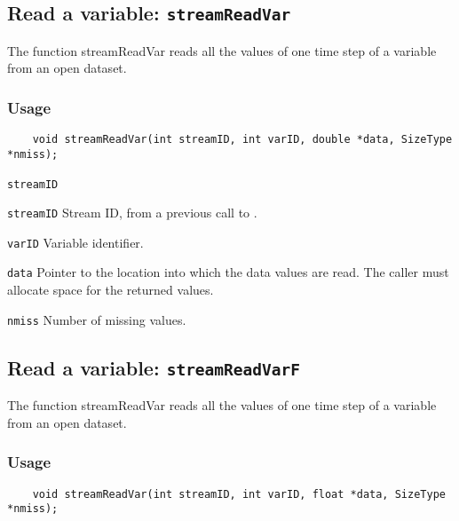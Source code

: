 

\subsection{Read a variable: \texttt{streamReadVar}}
\label{streamReadVar}

The function streamReadVar reads all the values of one time step of a variable
from an open dataset.
\subsubsection*{Usage}

\begin{verbatim}
    void streamReadVar(int streamID, int varID, double *data, SizeType *nmiss);
\end{verbatim}

\hspace*{4mm}\begin{minipage}[]{15cm}
\begin{deflist}{\texttt{streamID}\ }
\item[\texttt{streamID}]
Stream ID, from a previous call to {}.
\item[\texttt{varID}]
Variable identifier.
\item[\texttt{data}]
Pointer to the location into which the data values are read.
                     The caller must allocate space for the returned values.
\item[\texttt{nmiss}]
Number of missing values.

\end{deflist}
\end{minipage}


\subsection{Read a variable: \texttt{streamReadVarF}}
\label{streamReadVarF}

The function streamReadVar reads all the values of one time step of a variable
from an open dataset.
\subsubsection*{Usage}

\begin{verbatim}
    void streamReadVar(int streamID, int varID, float *data, SizeType *nmiss);
\end{verbatim}

